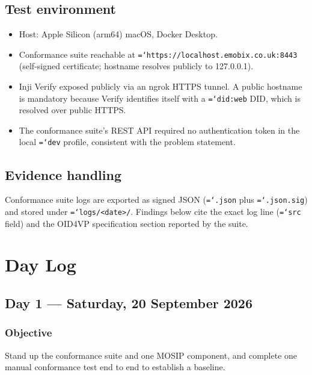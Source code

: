 \documentclass[11pt,a4paper]{article}
\newcommand{\tightlist}{\setlength{\itemsep}{0pt}\setlength{\parskip}{0pt}\setlength{\parsep}{0pt}}
\let\origtexttt\texttt
\renewcommand{\texttt}[1]{\origtexttt{\hyphenchar\font=`\-\relax #1}}
\renewcommand{\_}{\textunderscore\allowbreak}
\begin{document}
\subsection*{Test environment}
\begin{itemize}\tightlist
  \item Host: Apple Silicon (arm64) macOS, Docker Desktop.
  \item Conformance suite reachable at \texttt{https://localhost.emobix.co.uk:8443}
        (self-signed certificate; hostname resolves publicly to 127.0.0.1).
  \item Inji Verify exposed publicly via an ngrok HTTPS tunnel. A public hostname is
        mandatory because Verify identifies itself with a \texttt{did:web} DID, which is
        resolved over public HTTPS.
  \item The conformance suite's REST API required no authentication token in the local
        \texttt{dev} profile, consistent with the problem statement.
\end{itemize}

\subsection*{Evidence handling}
Conformance suite logs are exported as signed JSON (\texttt{.json} plus \texttt{.json.sig})
and stored under \texttt{logs/<date>/}. Findings below cite the exact log line
(\texttt{src} field) and the OID4VP specification section reported by the suite.

\newpage
\section{Day Log}

\subsection{Day 1 --- Saturday, 20 September 2026}

\subsubsection*{Objective}
Stand up the conformance suite and one MOSIP component, and complete one manual
conformance test end to end to establish a baseline.
\end{document}
